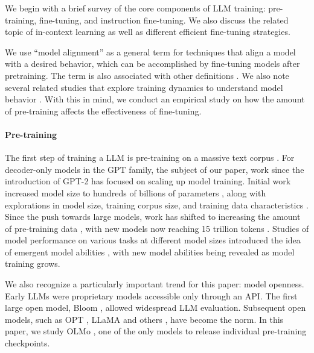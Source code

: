 We begin with a brief survey of the core components of LLM training: pre-training, fine-tuning, and instruction fine-tuning. 
We also discuss the related topic of in-context learning as well as different efficient fine-tuning strategies.

We use ``model alignment'' as a general term for techniques that align a model with a desired behavior, which can be accomplished by fine-tuning models after pretraining. The term is also associated with other definitions \cite{shen2024bidirectional}. 
We also note several related studies that explore training dynamics to understand model behavior \cite{tirumala2022memorization, chen2023sudden, tian2023scan}.
With this in mind, we conduct an empirical study on how the amount of pre-training affects the effectiveness of fine-tuning.

\paragraph{Pre-training}
The first step of training a LLM is pre-training on a massive text corpus
 \cite{achiam2023gpt, touvron2023llama, groeneveld2024olmo}.
For decoder-only models in the GPT family, the subject of our paper, work since the introduction of GPT-2 \cite{radford2019language} has focused on scaling up model training. 
Initial work increased model size to hundreds of billions of parameters \cite{brown2020language, rae2021scaling, chowdhery2023palm}, along with explorations in model size, training corpus size, and training data characteristics \cite{hoffmann2022training, gururangan-etal-2020-dont}. 
Since the push towards large models, work has shifted to increasing the amount of pre-training data \cite{together2023redpajama, soldaini2024dolma}, with new models now reaching 15 trillion tokens \cite{llama3modelcard}. 
Studies of model performance on various tasks at different model sizes introduced the idea of emergent model abilities \cite{wei2022emergent}, with new model abilities being revealed as model training grows.

We also recognize a particularly important trend for this paper: model openness. 
Early LLMs were proprietary models accessible only through an API. 
The first large open model, Bloom \cite{bloom-strom-etal-2023-preparing}, allowed widespread LLM evaluation. 
Subsequent open models, such as OPT \cite{zhang2022opt}, LLaMA \cite{touvron2023llama,keles-bayrakli-2024-llama-2} and others \cite{biderman2023pythia, openlm, almazrouei2023falcon}, have become the norm. 
In this paper, we study OLMo \cite{groeneveld2024olmo}, one of the only models to release individual pre-training checkpoints.

